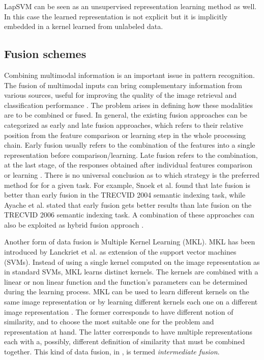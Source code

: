 \documentclass[journal,11pt]{IEEEtran}
\newcommand{\ADD}[1]{#1}
\begin{document}
LapSVM \cite{belkin2006manifold} can be seen as an unsupervised representation learning method as well. In this case the learned representation is not explicit but it is implicitly embedded in a kernel learned from unlabeled data.

\subsection{Fusion schemes}
\ADD{
Combining multimodal information is an important issue in pattern recognition. The
fusion of multimodal inputs can bring complementary information from various
sources, useful for improving the quality of the image retrieval and classification performance \cite{atrey2010multimodal}. The problem arises in defining how these modalities are to be
combined or fused. In general,
the existing fusion approaches can be categorized as early and late fusion
approaches, which refers to their relative position from the
feature comparison or learning step in the whole processing chain. Early fusion usually refers
to the combination of the features into a single representation before comparison/learning.
Late fusion refers to the combination, at the last stage, of the responses obtained after
individual features comparison or learning \cite{snoek2005early,noble04}.
There is no universal conclusion as to which strategy is
the preferred method for for a given task. For example, Snoek et al. \cite{snoek2005early}
found that late fusion is better than early fusion in the TRECVID 2004 semantic
indexing task, while Ayache et al. \cite{ayache2007classifier} stated that early fusion gets better results
than late fusion on the TRECVID 2006 semantic indexing task.
A combination of these approaches can also be exploited as hybrid fusion
approach \cite{wu2005multi}.
}

\ADD{Another form of data fusion is Multiple Kernel Learning (MKL). MKL has been introduced by Lanckriet et al. \cite{lanckriet04} as extension of the support vector machines (SVMs). Instead of using a single kernel computed on the image representation as in standard SVMs, MKL learns distinct kernels. The kernels are combined with a linear or non linear function and the function's parameters can be determined during the learning process. MKL can be used to learn different kernels on the same image representation or by learning different kernels each one on a different image representation \cite{gonen2011multiple}. The former corresponds to have different notion of similarity, and to choose the most suitable one for the problem and representation at hand. The latter corresponds to have multiple representations each with a, possibly, different definition of similarity that must be combined together. This kind of data fusion, in \cite{noble04}, is termed \emph{intermediate fusion}.}
\end{document}
